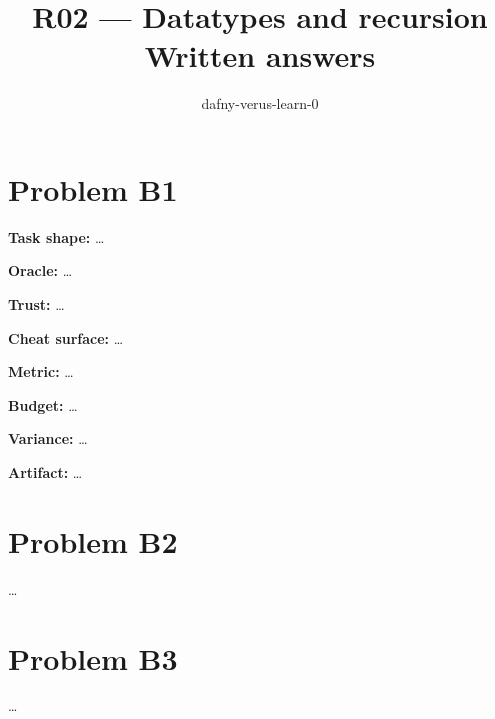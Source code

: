 \documentclass[11pt]{article}
\title{R02 --- Datatypes and recursion \\ \large Written answers}
\author{dafny-verus-learn-0}
\date{}
\begin{document}
\maketitle
\section*{Problem B1}\label{ans:B1}
\begin{answer}
\textbf{Task shape:} \dots

\textbf{Oracle:} \dots

\textbf{Trust:} \dots

\textbf{Cheat surface:} \dots

\textbf{Metric:} \dots

\textbf{Budget:} \dots

\textbf{Variance:} \dots

\textbf{Artifact:} \dots
\end{answer}

\section*{Problem B2}\label{ans:B2}
\begin{answer}
\dots
\end{answer}

\section*{Problem B3}\label{ans:B3}
\begin{answer}
\dots
\end{answer}
\end{document}
